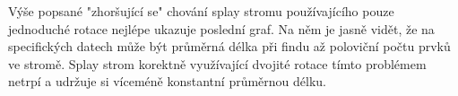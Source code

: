 \documentclass[12pt,a4paper]{report}
\begin{document}
Výše popsané "zhoršující se" chování splay stromu používajícího pouze jednoduché rotace nejlépe ukazuje poslední graf. Na něm je jasně vidět, že na specifických datech může být průměrná délka při findu až poloviční počtu prvků ve stromě. Splay strom korektně využívající dvojité rotace tímto problémem netrpí a udržuje si víceméně konstantní průměrnou délku. 
\end{document}
